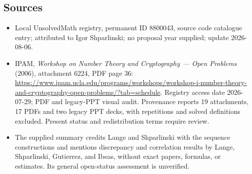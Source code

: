\documentclass[11pt]{article}
\begin{document}
\subsection{Sources}
\begin{itemize}
\item Local UnsolvedMath registry, permanent ID 8800043, source code catalogue entry; attributed to Igor Shparlinski; no proposal year supplied; update 2026-08-06.
\item IPAM, \emph{Workshop on Number Theory and Cryptography --- Open Problems} (2006), attachment 6224, PDF page 36: \url{https://www.ipam.ucla.edu/programs/workshops/workshop-i-number-theory-and-cryptography-open-problems/?tab=schedule}. Registry access date 2026-07-29; PDF and legacy-PPT visual audit. Provenance reports 19 attachments, 17 PDFs and two legacy PPT decks, with repetitions and solved definitions excluded. Present status and redistribution terms require review.
\item The supplied summary credits Lange and Shparlinski with the sequence constructions and mentions discrepancy and correlation results by Lange, Shparlinski, Gutierrez, and Ibeas, without exact papers, formulas, or estimates. Its general open-status assessment is unverified.
\end{itemize}
\end{document}

